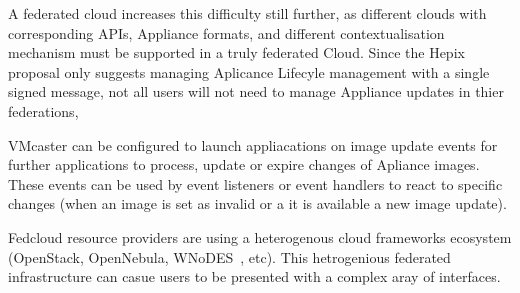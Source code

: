 \documentclass{llncs_Ibergrid2013}
\begin{document}
A federated cloud increases this difficulty still further, as different clouds with corresponding APIs, Appliance formats, and different contextualisation mechanism must be supported in a truly federated Cloud. Since the Hepix proposal only suggests managing Aplicance Lifecyle management with a single signed message, not all users will not need to manage Appliance updates in thier federations, 

VMcaster can be configured to launch appliacations on image update events for further applications to process, update or expire changes of Apliance images.  These events can be used by event listeners or event handlers to react to specific changes (when an image is set as invalid or a it is available a new image update). 

Fedcloud resource providers are using a heterogenous cloud frameworks ecosystem (OpenStack, OpenNebula, WNoDES~\cite{wnodes}, etc). This hetrogenious federated infrastructure can casue users to be presented with a complex aray of interfaces. 
\end{document}
